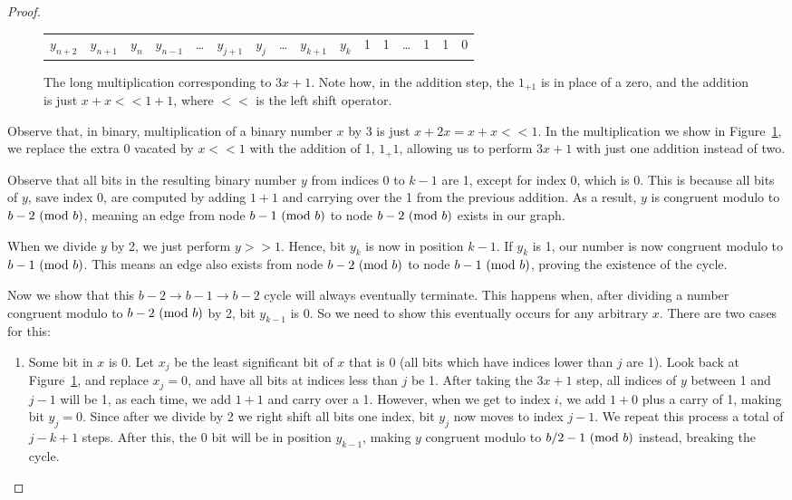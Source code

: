 \begin{proof}
\begin{figure}
\begin{tabular}{*{16}c}
  \hline
  $ y_{n+2}$  & $ y_{n+1}$  & $ y_{n}$  & $ y_{n-1}$  & \ldots & $ y_{j+1}$  & $ y_{j}$  & \ldots & $ y_{k+1}$  & $ y_{k}$  & 1 & 1 & \ldots & 1 & 1 & 0 
\end{tabular}
\caption{The long multiplication corresponding to $3x + 1$. Note how, in the addition step, the $1_{+1}$ is in place of a zero, and the addition is just $x + x << 1 + 1$, where $<<$ is the left shift operator.}
\label{fig:mul}
\end{figure}
Observe that, in binary, multiplication of a binary number $x$ by 3 is just $x + 2x = x + x << 1$. In the multiplication we show in Figure~\ref{fig:mul}, we replace the extra 0 vacated by $x << 1$ with the addition of 1, $1_+1$, allowing us to perform $3x+1$ with just one addition instead of two. \par
Observe that all bits in the resulting binary number $y$ from indices 0 to $k-1$ are 1, except for index 0, which is 0. This is because all bits of $y$, save index 0, are computed by adding $1+1$ and carrying over the 1 from the previous addition. As a result, $y$ is congruent modulo to $b-2 \ (\mathrm{mod}\ b)$, meaning an edge from node $b-1 \ (\mathrm{mod}\ b)$ to node $b-2 \ (\mathrm{mod}\ b)$ exists in our graph.\par
When we divide $y$ by 2, we just perform $y >> 1$. Hence, bit $y_k$ is now in position $k-1$. If $y_k$ is 1, our number is now congruent modulo to $b-1 \ (\mathrm{mod}\ b)$. This means an edge also exists from node $b-2 \ (\mathrm{mod}\ b)$ to node $b-1 \ (\mathrm{mod}\ b)$, proving the existence of the cycle. \par
Now we show that this $b-2 \rightarrow b-1 \rightarrow b-2$ cycle will always eventually terminate. This happens when, after dividing a number congruent modulo to $b-2 \ (\mathrm{mod}\ b)$ by 2, bit $y_{k-1}$ is 0. So we need to show this eventually occurs for any arbitrary $x$. There are two cases for this:
\begin{enumerate}
    \item Some bit in $x$ is 0. Let $x_j$ be the least significant bit of $x$ that is 0 (all bits which have indices lower than $j$ are 1). Look back at Figure~\ref{fig:mul}, and replace $x_j = 0$, and have all bits at indices less than $j$ be 1. After taking the $3x+1$ step, all indices of $y$ between 1 and $j-1$ will be 1, as each time, we add $1 + 1$ and carry over a 1. However, when we get to index $i$, we add $1 + 0$ plus a carry of 1, making bit $y_j = 0$. Since after we divide by 2 we right shift all bits one index, bit $y_j$ now moves to index $j-1$. We repeat this process a total of $j-k+1$ steps. After this, the 0 bit will be in position $y_{k-1}$, making $y$ congruent modulo to $b/2 - 1 \ (\mathrm{mod}\ b)$ instead, breaking the cycle.

\end{enumerate}
\end{proof}
